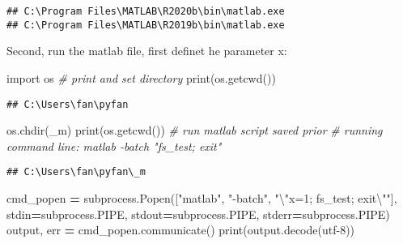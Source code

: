 \documentclass[
]{book}
\newenvironment{Shaded}{\begin{snugshade}}{\end{snugshade}}
\newcommand{\BuiltInTok}[1]{#1}
\newcommand{\CharTok}[1]{\textcolor[rgb]{0.31,0.60,0.02}{#1}}
\newcommand{\CommentTok}[1]{\textcolor[rgb]{0.56,0.35,0.01}{\textit{#1}}}
\newcommand{\ImportTok}[1]{#1}
\newcommand{\NormalTok}[1]{#1}
\newcommand{\OperatorTok}[1]{\textcolor[rgb]{0.81,0.36,0.00}{\textbf{#1}}}
\newcommand{\StringTok}[1]{\textcolor[rgb]{0.31,0.60,0.02}{#1}}
\begin{document}
\begin{verbatim}
## C:\Program Files\MATLAB\R2020b\bin\matlab.exe
## C:\Program Files\MATLAB\R2019b\bin\matlab.exe
\end{verbatim}

Second, run the matlab file, first definet he parameter x:

\begin{Shaded}
\begin{Highlighting}[]
\ImportTok{import}\NormalTok{ os}
\CommentTok{\# print and set directory}
\BuiltInTok{print}\NormalTok{(os.getcwd())}
\end{Highlighting}
\end{Shaded}

\begin{verbatim}
## C:\Users\fan\pyfan
\end{verbatim}

\begin{Shaded}
\begin{Highlighting}[]
\NormalTok{os.chdir(}\StringTok{\textquotesingle{}\_m\textquotesingle{}}\NormalTok{)}
\BuiltInTok{print}\NormalTok{(os.getcwd())}
\CommentTok{\# run matlab script saved prior}
\CommentTok{\# running command line: matlab {-}batch "fs\_test; exit"}
\end{Highlighting}
\end{Shaded}

\begin{verbatim}
## C:\Users\fan\pyfan\_m
\end{verbatim}

\begin{Shaded}
\begin{Highlighting}[]
\NormalTok{cmd\_popen }\OperatorTok{=}\NormalTok{ subprocess.Popen([}\StringTok{"matlab"}\NormalTok{, }\StringTok{"{-}batch"}\NormalTok{, }\StringTok{"}\CharTok{\textbackslash{}"}\StringTok{x=1; fs\_test; exit}\CharTok{\textbackslash{}"}\StringTok{"}\NormalTok{],}
\NormalTok{                             stdin}\OperatorTok{=}\NormalTok{subprocess.PIPE,}
\NormalTok{                             stdout}\OperatorTok{=}\NormalTok{subprocess.PIPE,}
\NormalTok{                             stderr}\OperatorTok{=}\NormalTok{subprocess.PIPE)}
\NormalTok{output, err }\OperatorTok{=}\NormalTok{ cmd\_popen.communicate()}
\BuiltInTok{print}\NormalTok{(output.decode(}\StringTok{\textquotesingle{}utf{-}8\textquotesingle{}}\NormalTok{))}
\end{Highlighting}
\end{Shaded}
\end{document}
